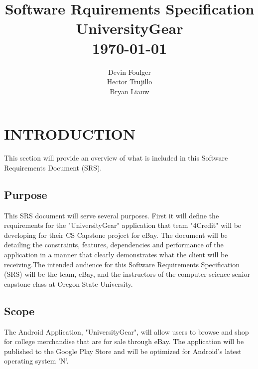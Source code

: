 \documentclass[journal,compsoc, 10pt, draftclsnofoot, onecolumn]{IEEEtran}
\begin{document}
\title{\vspace{20em}Software Rquirements Specification \\{\vspace{-1ex}\huge UniversityGear} \\ {\large \today}}
\author{\vspace{10ex}Devin Foulger \\{\vspace{-1ex}Hector Trujillo} \\{\vspace{-1ex}Bryan Liauw}}

\begin{titlepage}

\maketitle
\thispagestyle{empty}

\end{titlepage}

\tableofcontents

\section{INTRODUCTION}

This section will provide an overview of what is included in this Software 
Requirements Document (SRS).

\subsection{Purpose}

This SRS document will serve several purposes. First it will define the 
requirements for the "UniversityGear" application that team "4Credit"
 will be developing for their CS Capstone project for eBay. The 
document will be detailing the constraints, features, dependencies and performance 
of the application in a manner that clearly demonstrates what the client will be
 receiving.The intended audience for this Software Requirements Specification 
(SRS) will be the team, eBay, and the instructors of the computer science senior
 capstone class at Oregon State University. 

\subsection{Scope}

The Android Application, "UniversityGear", will allow users to browse and 
shop for college merchandise that are for sale through eBay. The application 
will be published to the Google Play Store and will be optimized for Android's 
latest operating system 'N'. \newline
\end{document}

